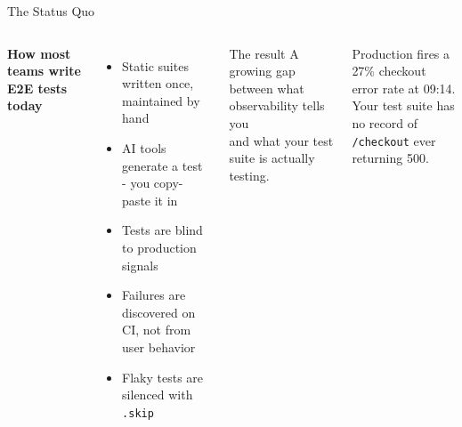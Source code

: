 \documentclass[aspectratio=169,10pt]{beamer}
\begin{document}
\begin{frame}{The Status Quo}
  \begin{columns}[T]
      \textbf{How most teams write E2E tests today}

      \vspace{0.6em}
      \begin{itemize}
        \setlength\itemsep{0.5em}
        \item Static suites written once, maintained by hand
        \item AI tools generate a test - you copy-paste it in
        \item Tests are blind to production signals
        \item Failures are discovered on CI, not from user behavior
        \item Flaky tests are silenced with \texttt{.skip}
      \end{itemize}

      \begin{alertblock}{The result}
        A growing gap between what observability tells you\\
        and what your test suite is actually testing.
      \end{alertblock}

      \vspace{0.8em}
      Production fires a 27\% checkout error rate at 09:14.\\[0.4em]
      Your test suite has no record of \texttt{/checkout} ever returning 500.
  \end{columns}
\end{frame}
\end{document}
